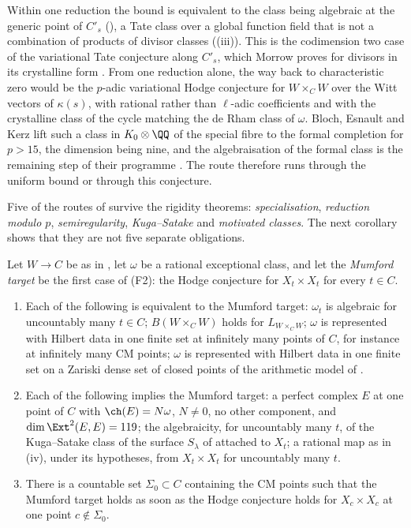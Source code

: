 \begin{remark}
Within one reduction the bound is equivalent to the class being algebraic at
the generic point of $C'_{s}$ (), a Tate class over a
global function field that is not a combination of products of divisor
classes ((iii)). This is the codimension two case of the
variational Tate conjecture along $C'_{s}$, which Morrow proves for divisors
in its crystalline form \cite{Mor19}. From one reduction alone, the way back
to characteristic zero would be the $p$-adic variational Hodge conjecture for
$W\times_{C}W$ over the Witt vectors of $\kappa(s)$, with rational rather than
$\ell$-adic coefficients and with the crystalline class of the cycle matching
the de Rham class of $\omega$. Bloch, Esnault and Kerz lift such a class in
$K_{0}\otimes\QQ$ of the special fibre to the formal completion for $p>15$,
the dimension being nine, and the algebraisation of the formal class is the
remaining step of their programme \cite[Theorem~1.3]{BEK14}. The route
therefore runs through the uniform bound or through this conjecture.
\end{remark}

Five of the routes of  survive the rigidity theorems:
\emph{specialisation}, \emph{reduction modulo $p$}, \emph{semiregularity},
\emph{Kuga--Satake} and \emph{motivated classes}. The next corollary shows
that they are not five separate obligations.

\begin{corollary}\label{cor:mumfordone}
Let $W\to C$ be as in , let $\omega$ be a rational
exceptional class, and let the \emph{Mumford target} be the first case of
\textup{(F2)}: the Hodge conjecture for $X_{t}\times X_{t}$ for every $t\in C$.
\begin{enumerate}[label=\textup{(\roman*)},leftmargin=2.6em,itemsep=2pt]
\item Each of the following is equivalent to the Mumford target: $\omega_{t}$ is
  algebraic for uncountably many $t\in C$; $B(W\times_{C}W)$ holds for
  $L_{W\times_{C}W}$; $\omega$ is represented with Hilbert data in one finite
  set at infinitely many points of $C$, for instance at infinitely many CM
  points; $\omega$ is represented with Hilbert data in one finite set on a
  Zariski dense set of closed points of the arithmetic model of
  .
\item Each of the following implies the Mumford target: a perfect complex $E$
  at one point of $C$ with $\ch(E)=N\omega$, $N\ne0$, no other component, and
  $\dim\Ext^{2}(E,E)=119$; the algebraicity, for uncountably many $t$, of the
  Kuga--Satake class of the surface $S_{\lambda}$ of 
  attached to $X_{t}$; a rational map as in (iv), under
  its hypotheses, from $X_{t}\times X_{t}$ for uncountably many $t$.
\item There is a countable set $\Sigma_{0}\subset C$ containing the CM points
  such that the Mumford target holds as soon as the Hodge conjecture holds for
  $X_{c}\times X_{c}$ at one point $c\notin\Sigma_{0}$.
\end{enumerate}
\end{corollary}


